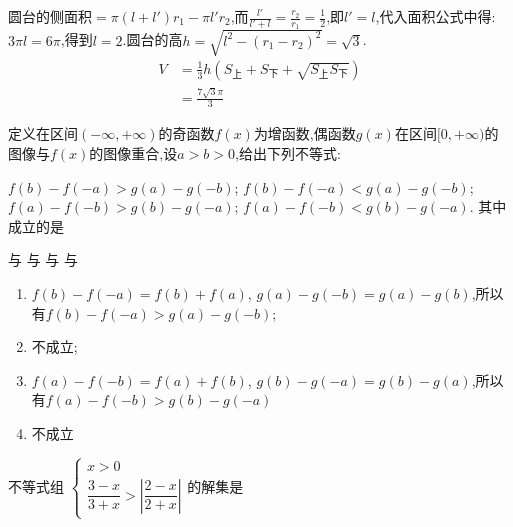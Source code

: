 \documentclass[answers]{exam}
\begin{document}
\begin{questions}
\begin{solution}
\begin{center}
		\end{center}

		圆台的侧面积$=\pi(l+l')r_1 - \pi l'r_2$,而$\frac{l'}{l'+l}=\frac{r_2}{r_1}=\frac12$,即$l'=l$,代入面积公式中得:
		$3\pi l = 6\pi$,得到$l=2$.圆台的高$h=\sqrt{l^2-(r_1-r_2)^2}=\sqrt{3}$.
		\begin{align*}
			V & = \frac13h{(S_上 + S_下 + \sqrt{S_上S_下})} \\
			  & = \frac{7\sqrt{3}\pi}{3}
		\end{align*}
	\end{solution}

	\question
	定义在区间$(-\infty,+\infty)$的奇函数$f(x)$为增函数,偶函数$g(x)$在区间$[0,+\infty)$的图像与$f(x)$的图像重合,设$a>b>0$,给出下列不等式:

	$f(b)-f(-a)>g(a)-g(-b)$; $f(b)-f(-a) < g(a) - g(-b)$;
	$f(a)-f(-b) > g(b) - g(-a)$; $f(a)-f(-b) < g(b) - g(-a)$.
	其中成立的是 \hfs

	\begin{oneparchoices}
		\choice {}与
		\choice {}与
		\CorrectChoice {}与
		\choice {}与
	\end{oneparchoices}

	\begin{solution}
		\begin{enumerate}[label=\protect\circled{\arabic*}]
			\item $f(b) - f(-a) = f(b)+f(a)$, $g(a) - g(-b) = g(a) - g(b)$,所以有$f(b)-f(-a) > g(a) - g(-b)$;
			\item 不成立;
			\item $f(a) - f(-b) = f(a) + f(b)$, $g(b) - g(-a)= g(b) - g(a)$,所以有$f(a) - f(-b) > g(b) - g(-a)$
			\item 不成立
		\end{enumerate}
	\end{solution}

	\question 不等式组 \begin{math}
		\begin{cases}
			x> 0 \\
			\dfrac{3-x}{3+x} > \left|\dfrac{2-x}{2+x}\right|
		\end{cases}
	\end{math}的解集是 \hfs


\end{questions}
\end{document}
